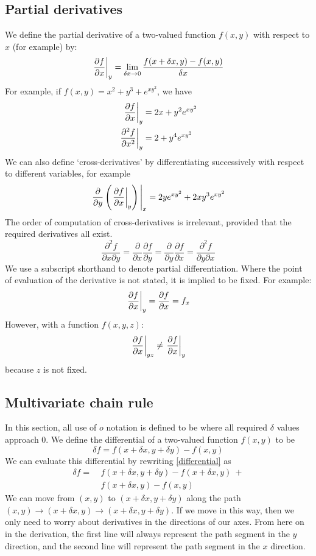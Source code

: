 \subsection{Partial derivatives}
We define the partial derivative of a two-valued function \(f(x, y)\) with respect to \(x\) (for example) by:
\begin{equation}
	\eval{\frac{\partial f}{\partial x}}_{y} = \lim_{\delta x\to 0} \frac{f(x + \delta x, y) - f(x, y)}{\delta x}
\end{equation}
For example, if \(f(x,y) = x^2 + y^3 + e^{xy^2}\), we have
\begin{align*}
	\eval{\frac{\partial f}{\partial x}}_{y}     & = 2x + y^2 e^{xy^2} \\
	\eval{\frac{\partial^2 f}{\partial x^2}}_{y} & = 2 + y^4 e^{xy^2}
\end{align*}
We can also define `cross-derivatives' by differentiating successively with respect to different variables, for example
\[
	\eval{\frac{\partial}{\partial y} \left( \eval{\frac{\partial f}{\partial x}}_{y} \right)}_{x} = 2ye^{xy^2} + 2xy^3e^{xy^2}
\]
The order of computation of cross-derivatives is irrelevant, provided that the required derivatives all exist.
\begin{equation}
	\frac{\partial^2 f}{\partial x \partial y} = \frac{\partial}{\partial x}\frac{\partial f}{\partial y} = \frac{\partial}{\partial y}\frac{\partial f}{\partial x} = \frac{\partial^2 f}{\partial y \partial x}
\end{equation}
We use a subscript shorthand to denote partial differentiation.
Where the point of evaluation of the derivative is not stated, it is implied to be fixed.
For example:
\[
	\eval{\frac{\partial f}{\partial x}}_{y} = \frac{\partial f}{\partial x} = f_x
\]
However, with a function \(f(x, y, z)\):
\[
	\eval{\frac{\partial f}{\partial x}}_{yz} \neq \eval{\frac{\partial f}{\partial x}}_{y}
\]
because \(z\) is not fixed.

\subsection{Multivariate chain rule}
In this section, all use of \(o\) notation is defined to be where all required \(\delta\) values approach 0.
We define the differential of a two-valued function \(f(x, y)\) to be
\begin{equation}\label{differential}
	\delta f = f(x + \delta x, y + \delta y) - f(x, y)
\end{equation}
We can evaluate this differential by rewriting \eqref{differential} as
\begin{align*}
	\delta f =\  & f(x + \delta x, y + \delta y) - f(x + \delta x, y)\ + \\
	             & f(x + \delta x, y) - f(x, y)
\end{align*}
We can move from \((x, y)\) to \((x + \delta x, y + \delta y)\) along the path \((x, y) \to (x + \delta x, y) \to (x + \delta x, y + \delta y)\).
If we move in this way, then we only need to worry about derivatives in the directions of our axes.
From here on in the derivation, the first line will always represent the path segment in the \(y\) direction, and the second line will represent the path segment in the \(x\) direction.

